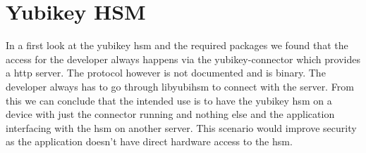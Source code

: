 \chapter{Yubikey HSM}

In a first look at the yubikey hsm and the required packages we found that the access for the developer always happens via the yubikey-connector which provides a http server.
The protocol however is not documented and is binary. The developer always has to go through libyubihsm to connect with the server.
From this we can conclude that the intended use is to have the yubikey hsm on a device with just the connector running and nothing else and the application interfacing with the hsm on another server.
This scenario would improve security as the application doesn't have direct hardware access to the hsm.